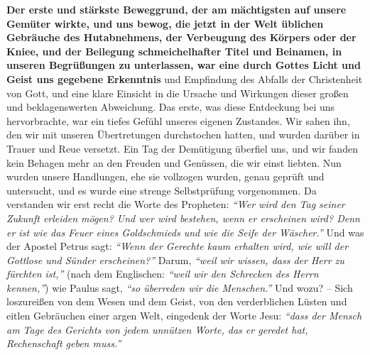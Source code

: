 \label{ref:09_05_offenbarung} \textbf{Der erste und stärkste Beweggrund, der am
mächtigsten auf unsere
Gemüter
wirkte, und uns bewog, die jetzt in der Welt üblichen Gebräuche des
Hutabnehmens, der Verbeugung des Körpers oder der Kniee, und
der Beilegung
schmeichelhafter Titel und Beinamen, in unseren Begrüßungen zu unterlassen, war
eine durch Gottes Licht und Geist uns gegebene
Erkenntnis}
und Empfindung des
Abfalls der Christenheit von Gott, und eine klare Einsicht in die Ursache und
Wirkungen dieser großen und beklagenswerten Abweichung. Das erste, was diese
Entdeckung bei uns hervorbrachte, war ein tiefes Gefühl unseres eigenen
Zustandes.
Wir sahen ihn, den wir mit unseren Übertretungen durchstochen hatten, und wurden
darüber in Trauer und Reue versetzt. Ein Tag der Demütigung
überfiel uns, und
wir fanden kein Behagen mehr an den Freuden und Genüssen, die wir einst liebten.
Nun wurden unsere Handlungen, ehe sie vollzogen wurden, genau geprüft und
untersucht, und es wurde eine strenge Selbstprüfung
vorgenommen. Da verstanden
wir erst recht die Worte des Propheten:
\textit{"`Wer wird den Tag seiner Zukunft
erleiden mögen? Und wer wird bestehen, wenn er erscheinen wird? Denn er ist wie
das Feuer eines Goldschmieds und wie die Seife der Wäscher."'}
Und was der Apostel Petrus sagt:
\textit{"`Wenn der Gerechte kaum erhalten wird, wie will der Gottlose und Sünder
erscheinen?"'}
Darum,
\textit{"`weil wir wissen, dass der Herr zu fürchten ist,"'}
(nach dem Englischen:
\textit{"`weil wir den Schrecken des Herrn kennen,"'}) wie Paulus sagt,
\textit{"`so überreden wir die Menschen."'}
Und wozu? -- Sich loszureißen von dem Wesen
und dem Geist, von den verderblichen Lüsten und eitlen Gebräuchen einer argen
Welt,
eingedenk der Worte Jesu:
\textit{"`dass der Mensch am Tage des Gerichts von jedem
unnützen Worte, das er geredet hat, Rechenschaft geben
muss."'}

\medskip

